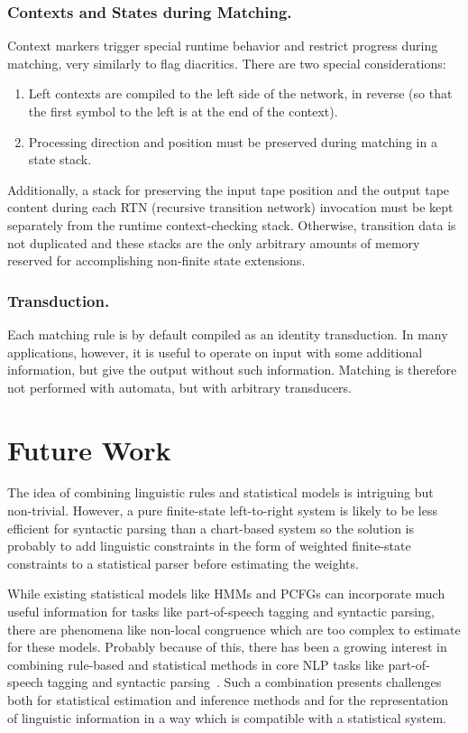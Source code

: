 \documentclass{llncs}
\begin{document}
\subsubsection{Contexts and States during Matching.}
Context markers trigger special runtime behavior and restrict
progress during matching, very similarly to flag diacritics.
There are two special considerations:

\begin{enumerate}
\item Left contexts are compiled to the left side of the network, in reverse
(so that the first symbol to the left is at the end of the context).
\item Processing direction and position must be preserved during
matching in a state stack.
\end{enumerate}

Additionally, a stack for preserving the input tape position
and the output tape content during each RTN (recursive transition
network) invocation must be kept separately from the runtime
context-checking stack. Otherwise, transition data is not duplicated
and these stacks are the only arbitrary amounts of memory reserved
for accomplishing non-finite state extensions.

\subsubsection{Transduction.}
Each matching rule is by default compiled as an identity transduction.
In many applications, however, it is useful to operate on input
with some additional information, but give the output
without such information. Matching is therefore not
performed with automata, but with arbitrary transducers.

\section{Future Work}\label{hfst:discussion}

The idea of combining linguistic rules and statistical models is intriguing but non-trivial. However, a pure finite-state left-to-right system is likely to be less efficient for syntactic parsing than a chart-based system so the solution is probably to add linguistic constraints in the form of weighted finite-state constraints to a statistical parser before estimating the weights.

While existing statistical models like HMMs and PCFGs can incorporate
much useful information for tasks like part-of-speech tagging and
syntactic parsing, there are phenomena like non-local congruence which are
too complex to estimate for these models. Probably because of this, there
has been a growing interest in combining rule-based and statistical
methods in core NLP tasks like part-of-speech tagging and syntactic
parsing~\cite{manning/2011}. Such a combination presents challenges
both for statistical estimation and inference methods and for the
representation of linguistic information in a way which is compatible
with a statistical system.
\end{document}
